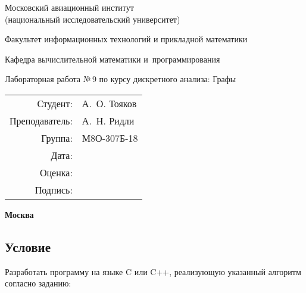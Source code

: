\documentclass[12pt]{article}
\begin{document}
\thispagestyle{empty}
\begin{center}
	\bfseries

	{\Large Московский авиационный институт\\ (национальный исследовательский университет)

	}

	\vspace{48pt}

	{\large Факультет информационных технологий и прикладной математики
	}

	\vspace{36pt}


	{\large Кафедра вычислительной математики и~программирования

	}


	\vspace{48pt}

	{Лабораторная работа №\,9 по курсу дискретного анализа: Графы}

\end{center}

\vspace{72pt}

\begin{flushright}
	\begin{tabular}{rl}
		Студент:       & А.\, О. Тояков   \\
		Преподаватель: & А.\, Н. Ридли \\
		Группа:        & М8О-307Б-18      \\
		Дата:          &                 \\
		Оценка:        &                  \\
		Подпись:       &                  \\
	\end{tabular}
\end{flushright}

\vfill

\begin{center}
	\bfseries
	Москва\\
	\the\year
\end{center}

\newpage

\subsection*{Условие}

Разработать программу на языке C или C++, реализующую указанный алгоритм согласно заданию:
\end{document}
